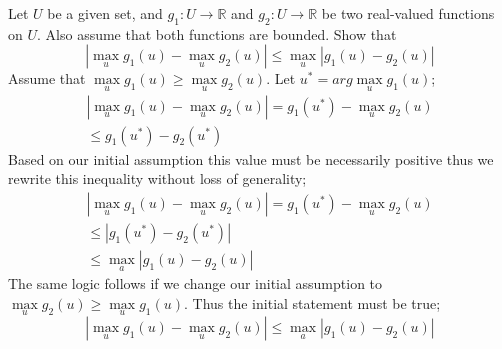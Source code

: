 \documentclass{article}
\begin{document}
\begin{tcolorbox}[colback=blue!5!white,colframe=blue!75!black,title=Question 5]
    Let $\mathit{U}$ be a given set, and $g_1: \mathit{U} \rightarrow \mathbb{R}$ and $g_2: \mathit{U} \rightarrow \mathbb{R}$ be two real-valued
    functions on $\mathit{U}$. Also assume that both functions are bounded. Show that
    \begin{equation}
        |\max\limits_{u} g_1(u) - \max\limits_{u} g_2(u)| \leq \max\limits_{u} | g_1(u) - g_2(u)|
    \end{equation}
    \tcblower
    Assume that $\max\limits_u g_1(u) \geq \max\limits_u g_2(u)$. Let $u^* = arg\max\limits_u g_1(u)$;
    \begin{equation}
        \begin{split}
            |\max\limits_u g_1(u) - \max\limits_u g_2(u)| = g_1(u^*) - \max\limits_u g_2(u)\\
            \leq g_1(u^*) - g_2(u^*)
        \end{split}
    \end{equation}
    Based on our initial assumption this value must be necessarily positive thus we rewrite this inequality without loss of generality;
    \begin{equation}
        \begin{split}
            |\max\limits_u g_1(u) - \max\limits_u g_2(u)| = g_1(u^*) - \max\limits_u g_2(u)\\
            \leq |g_1(u^*) - g_2(u^*)|\\
            \leq \max\limits_a |g_1(u) - g_2(u)|
        \end{split}
    \end{equation}
    The same logic follows if we change our initial assumption to $\max\limits_u g_2(u) \geq \max\limits_u g_1(u)$.
    Thus the initial statement must be true;
    \begin{equation}
        |\max\limits_u g_1(u) - \max\limits_u g_2(u)| \leq \max\limits_a |g_1(u) - g_2(u)|
    \end{equation}
\end{tcolorbox}
\end{document}
